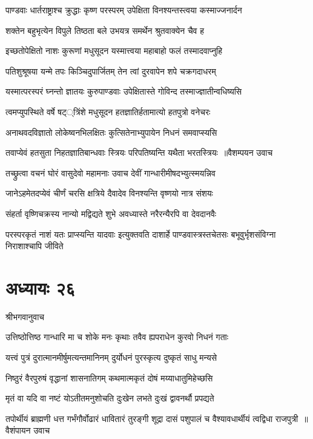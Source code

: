 \twolineshloka
{पाण्डवाः धार्तराष्ट्राश्च क्रुद्धाः कृष्ण परस्परम्}
{उपेक्षिता विनश्यन्तस्त्वया कस्माज्जनार्दन}


\twolineshloka
{शक्तेन बहुभृत्येन विपुले तिष्ठता बले}
{उभयत्र समर्थेन श्रुतवाक्येन चैव ह}


\twolineshloka
{इच्छतोपेक्षितो नाशः कुरूणां मधुसूदन}
{यस्मात्त्वया महाबाहो फलं तस्मादवाप्नुहि}


\twolineshloka
{पतिशुश्रूषया यन्मे तपः किञ्चिदुपार्जितम्}
{तेन त्वां दुरवापेन शपे चक्रगदाधरम्}


\twolineshloka
{यस्मात्परस्परं घ्नन्तो ज्ञातयः कुरुपाण्डवाः}
{उपेक्षितास्ते गोविन्द तस्माज्ज्ञातीन्वधिष्यसि}


\twolineshloka
{त्वमप्युपस्थिते वर्षे षट््त्रिंशे मधुसूदन}
{हतज्ञातिर्हतामात्यो हतपुत्रो वनेचरः}


\twolineshloka
{अनाथवदविज्ञातो लोकेष्वनभिलक्षितः}
{कुत्सितेनाभ्युपायेन निधनं समवाप्स्यसि}


\threelineshloka
{तवाप्येवं हतसुता निहतज्ञातिबान्धवाः}
{स्त्रियः परिपतिष्यन्ति यथैता भरतस्त्रियः ॥वैशम्पयन उवाच}
{}


\twolineshloka
{तच्छ्रुत्वा वचनं घोरं वासुदेवो महामनाः}
{उवाच देवीं गान्धारीमीषदभ्युत्स्मयन्निव}


\twolineshloka
{जानेऽहमेतदप्येवं चीर्णं चरसि क्षत्रिये}
{दैवादेव विनश्यन्ति वृष्णयो नात्र संशयः}


\twolineshloka
{संहर्ता वृष्णिचक्रस्य नान्यो मद्विद्यते शुभे}
{अवध्यास्ते नरैरन्यैरपि वा देवदानवैः}


\threelineshloka
{परस्परकृतं नाशं यतः प्राप्स्यन्ति यादवाः}
{इत्युक्तवति दाशार्हे पाण्डवास्त्रस्तचेतसः}
{बभूवुर्भृशसंविग्ना निराशाश्चापि जीविते}


\chapter{अध्यायः २६}
\twolineshloka
{श्रीभगवानुवाच}
{}


\twolineshloka
{उत्तिष्ठोत्तिष्ठ गान्धारि मा च शोके मनः कृथाः}
{तवैव ह्यपराधेन कुरवो निधनं गताः}


\twolineshloka
{यत्त्वं पुत्रं दुरात्मानमीर्षुमत्यन्तमानिनम्}
{दुर्योधनं पुरस्कृत्य दुष्कृतं साधु मन्यसे}


\twolineshloka
{निष्ठुरं वैरपुरुषं वृद्धानां शासनातिगम्}
{कथमात्मकृतं दोषं मय्याधातुमिहेच्छसि}


\twolineshloka
{मृतं वा यदि वा नष्टं योऽतीतमनुशोचति}
{दुःखेन लभते दुःखं द्वावनर्थौ प्रपद्यते}


\threelineshloka
{तपोर्थीयं ब्राह्मणी धत्त गर्भंगौर्वोढारं धावितारं तुरङ्गी}
{शूद्रा दासं पशुपालं च वैश्यावधार्थीयं त्वद्विधा राजपुत्री ॥वैशंपायन उवाच}
{}


